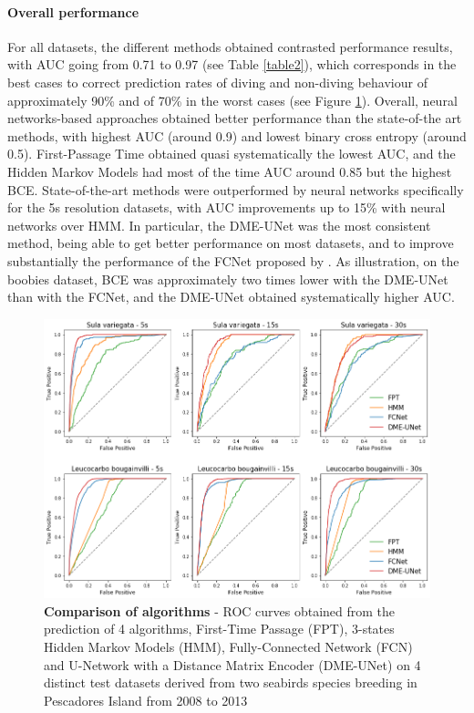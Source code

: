 \documentclass{article}
\begin{document}
\paragraph{Overall performance}
For all datasets, the different methods obtained contrasted performance results, with AUC going from 0.71 to 0.97 (see Table \ref{table2}), which corresponds in the best cases to correct prediction rates of diving and non-diving behaviour of approximately 90\% and of 70\% in the worst cases (see Figure \ref{figure1}). Overall, neural networks-based approaches obtained better performance than the state-of-the art methods, with highest AUC (around 0.9) and lowest binary cross entropy (around 0.5). First-Passage Time obtained quasi systematically the lowest AUC, and the Hidden Markov Models had most of the time AUC around 0.85 but the highest BCE. State-of-the-art methods were outperformed by neural networks specifically for the 5s resolution datasets, with AUC improvements up to 15\% with neural networks over HMM. In particular, the DME-UNet was the most consistent method, being able to get better performance on most datasets, and to improve substantially the performance of the FCNet proposed by \cite{browning_predicting_2018}. As illustration, on the boobies dataset, BCE was approximately two times lower with the DME-UNet than with the FCNet, and the DME-UNet obtained systematically higher AUC.

\begin{figure}[!h]
  \centering
  \includegraphics[scale=0.5]{figure1.png}
  \caption{\textbf{Comparison of algorithms} - ROC curves obtained from the prediction of 4 algorithms, First-Time Passage (FPT), 3-states Hidden Markov Models (HMM), Fully-Connected Network (FCN) and U-Network with a Distance Matrix Encoder (DME-UNet) on 4 distinct test datasets derived from two seabirds species breeding in Pescadores Island from 2008 to 2013}
  \label{figure1}
\end{figure}
\end{document}
